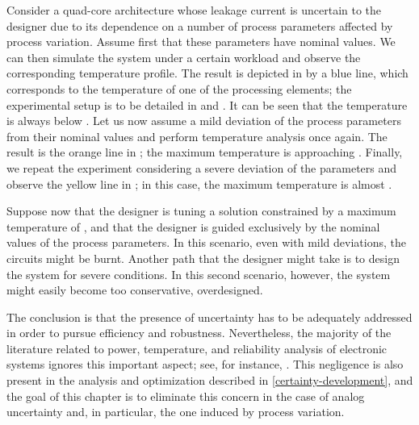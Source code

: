 Consider a quad-core architecture whose leakage current is uncertain to the
designer due to its dependence on a number of process parameters affected by
process variation. Assume first that these parameters have nominal values. We
can then simulate the system under a certain workload and observe the
corresponding temperature profile. The result is depicted in
 by a blue line, which corresponds to the temperature of one
of the processing elements; the experimental setup is to be detailed in
 and . It can be
seen that the temperature is always below . Let us now assume a mild
deviation of the process parameters from their nominal values and perform
temperature analysis once again. The result is the orange line in
; the maximum temperature is approaching .
Finally, we repeat the experiment considering a severe deviation of the
parameters and observe the yellow line in ; in this case,
the maximum temperature is almost .

Suppose now that the designer is tuning a solution constrained by a maximum
temperature of , and that the designer is guided exclusively by the
nominal values of the process parameters. In this scenario, even with mild
deviations, the circuits might be burnt. Another path that the designer might
take is to design the system for severe conditions. In this second scenario,
however, the system might easily become too conservative, overdesigned.

The conclusion is that the presence of uncertainty has to be adequately
addressed in order to pursue efficiency and robustness. Nevertheless, the
majority of the literature related to power, temperature, and reliability
analysis of electronic systems ignores this important aspect; see, for instance,
\cite{rao2009, rai2011, thiele2011}. This negligence is also present in the
analysis and optimization described in \cref{certainty-development}, and the
goal of this chapter is to eliminate this concern in the case of analog
uncertainty and, in particular, the one induced by process variation.
